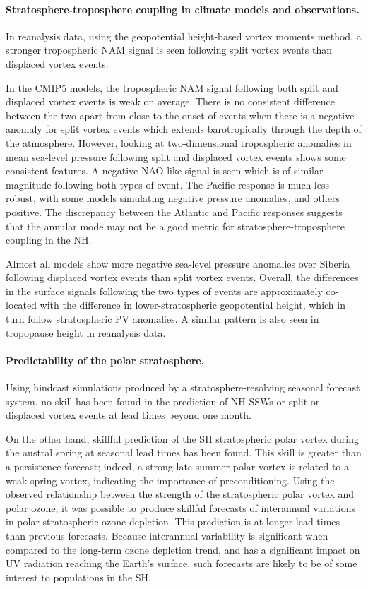 \paragraph{Stratosphere-troposphere coupling in climate models and
  observations.}  In reanalysis data, using the geopotential height-based vortex
moments method, a stronger tropospheric NAM signal is seen following split
vortex events than displaced vortex events.

In the CMIP5 models, the tropospheric NAM signal following both split and
displaced vortex events is weak on average. There is no consistent difference
between the two apart from close to the onset of events when there is a negative
anomaly for split vortex events which extends barotropically through the depth
of the atmosphere. However, looking at two-dimensional tropospheric anomalies in
mean sea-level pressure following split and displaced vortex events shows some
consistent features. A negative NAO-like signal is seen which is of similar
magnitude following both types of event. The Pacific response is much less
robust, with some models simulating negative pressure anomalies, and others
positive. The discrepancy between the Atlantic and Pacific responses suggests
that the annular mode may not be a good metric for stratosphere-troposphere
coupling in the NH.

Almost all models show more negative sea-level pressure anomalies over Siberia
following displaced vortex events than split vortex events. Overall, the
differences in the surface signals following the two types of events are
approximately co-located with the difference in lower-stratospheric geopotential
height, which in turn follow stratospheric PV anomalies. A similar pattern is
also seen in tropopause height in reanalysis data.

\paragraph{Predictability of the polar stratosphere.} Using hindcast simulations
produced by a stratosphere-resolving seasonal forecast system, no skill has been
found in the prediction of NH SSWs or split or displaced vortex events at lead
times beyond one month.

On the other hand, skillful prediction of the SH stratospheric polar vortex
during the austral spring at seasonal lead times has been found. This skill is
greater than a persistence forecast; indeed, a strong late-summer polar vortex
is related to a weak spring vortex, indicating the importance of
preconditioning. Using the observed relationship between the strength of the
stratospheric polar vortex and polar ozone, it was possible to produce skillful
forecasts of interannual variations in polar stratospheric ozone depletion. This
prediction is at longer lead times than previous forecasts. Because interannual
variability is significant when compared to the long-term ozone depletion trend,
and has a significant impact on UV radiation reaching the Earth's surface, such
forecasts are likely to be of some interest to populations in the SH.

